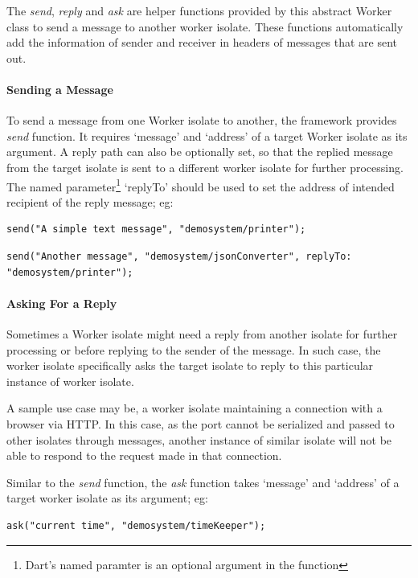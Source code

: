   The \emph{send}, \emph{reply} and \emph{ask} are helper functions provided by this abstract Worker class to send a message to another worker isolate. These functions automatically add the information of sender and receiver in headers of messages that are sent out.

  \paragraph{Sending a Message}
  \label{para:sendMessage}
  To send a message from one Worker isolate to another, the framework provides \emph{send} function. It requires ‘message’ and ‘address’ of a target Worker isolate as its argument. A reply path can also be optionally set, so that the replied message from the target isolate is sent to a different worker isolate for further processing. The named parameter\footnote{Dart's named paramter is an optional argument in the function} ‘replyTo’ should be used to set the address of intended recipient of the reply message; eg:
\begin{lstlisting}[numbers=none]
  send("A simple text message", "demosystem/printer");
\end{lstlisting}

\begin{lstlisting}[numbers=none]
  send("Another message", "demosystem/jsonConverter", replyTo: "demosystem/printer");
\end{lstlisting}

  \paragraph{Asking For a Reply}
  \label{subsec:askMessage}
  Sometimes a Worker isolate might need a reply from another isolate for further processing or before replying to the sender of the message. In such case, the worker isolate specifically asks the target isolate to reply to this particular instance of worker isolate.

  A sample use case may be, a worker isolate maintaining a connection with a browser via HTTP. In this case, as the port cannot be serialized and passed to other isolates through messages, another instance of similar isolate will not be able to respond to the request made in that connection.

  Similar to the \emph{send} function, the \emph{ask} function takes ‘message’ and ‘address’ of a target worker isolate as its argument; eg:
\begin{lstlisting}[numbers=none]
  ask("current time", "demosystem/timeKeeper");
\end{lstlisting}
